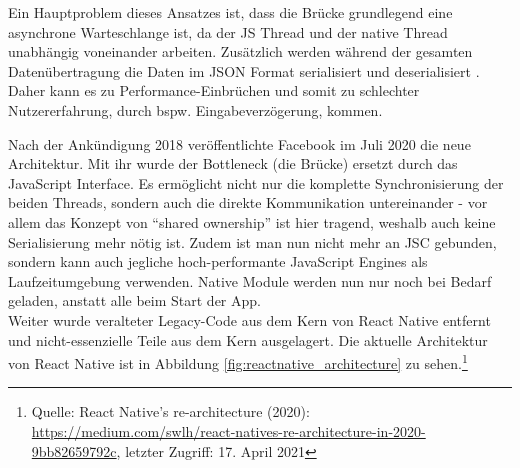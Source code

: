 \noindent
Ein Hauptproblem dieses Ansatzes ist, dass die Brücke grundlegend eine asynchrone Warteschlange ist, da der JS Thread und der native Thread unabhängig voneinander arbeiten. Zusätzlich werden während der gesamten Datenübertragung die Daten im JSON Format serialisiert und deserialisiert .
Daher kann es zu Performance-Einbrüchen und somit zu schlechter Nutzererfahrung, durch bspw. Eingabeverzögerung, kommen.

\noindent
Nach der Ankündigung 2018 veröffentlichte Facebook im Juli 2020 die neue Architektur. Mit ihr wurde der Bottleneck (die Brücke) ersetzt durch das JavaScript Interface.
Es ermöglicht nicht nur die komplette Synchronisierung der beiden Threads, sondern auch die direkte Kommunikation untereinander - vor allem das Konzept von \enquote{shared ownership} ist hier tragend, weshalb auch keine Serialisierung mehr nötig ist.
Zudem  ist man nun nicht mehr an JSC gebunden, sondern kann auch jegliche hoch-performante JavaScript Engines als Laufzeitumgebung verwenden.
Native Module werden nun nur noch bei Bedarf geladen, anstatt alle beim Start der App.\\
Weiter wurde veralteter Legacy-Code aus dem Kern von React Native entfernt und nicht-essenzielle Teile aus dem Kern ausgelagert. Die aktuelle Architektur von React Native ist  in Abbildung \ref{fig:reactnative_architecture} zu sehen.\footnote{Quelle: React Native's re-architecture (2020): \url{https://medium.com/swlh/react-natives-re-architecture-in-2020-9bb82659792c}, letzter Zugriff: 17. April 2021}

